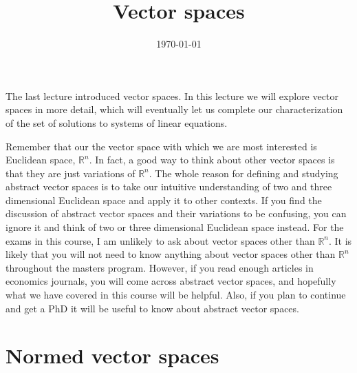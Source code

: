 \documentclass[12pt,reqno]{amsart}
\title{Vector spaces}
\date{\today}
\theoremstyle{definition}
\def\R{\mathbb{R}}
\begin{document}
\maketitle

The last lecture introduced vector spaces. In this lecture we will
explore vector spaces in more detail, which will eventually let us
complete our characterization of the set of solutions to systems of
linear equations. 

Remember that our the vector space with which we are most interested
is Euclidean space, $\R^n$. In fact, a good way to think about other
vector spaces is that they are just variations of $\R^n$. The whole
reason for defining and studying abstract vector spaces is to take our
intuitive understanding of two and three dimensional Euclidean space
and apply it to other contexts. If you find the discussion of abstract
vector spaces and their variations to be confusing, you can ignore it
and think of two or three dimensional Euclidean space instead. For the
exams in this course, I am unlikely to ask about vector spaces
other than $\R^n$. It is likely that you will not need to know
anything about vector spaces other than $\R^n$ throughout the masters
program. However, if you read enough articles in economics journals,
you will come across abstract vector spaces, and hopefully what we
have covered in this course will be helpful. Also, if you plan to
continue and get a PhD it will be useful to know about abstract vector
spaces.

\section{Normed vector spaces}
\end{document}
